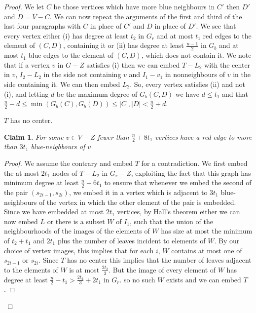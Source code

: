 \documentclass[11pt]{article}
\newtheorem{claim}[theorem]{Claim}
\begin{document}
\begin{proof}
We let $C$ be those vertices which have more blue neighbours in $C'$ then $D'$ and $D=V-C$. 
We can now repeat the arguments of the first and third of the last four paragraphs with $C$ in place of $C'$ and $D$ in place of $D'$. 
We see that every vertex either (i) has degree at least $t_2$ in $G_r$  and at most $t_1$ red edges to the element of $(C,D)$,
containing it or (ii) has degree at least $\frac{n-1}{2}$ in $G_b$  and at most $t_1$ blue  edges to the element of $(C,D)$,
which does not contain it. We note that if  a vertex $v$  in $G-Z$ satisfies  (i) then we can embed $T-L_2$ with the center in $v$, $I_2-L_2$ in the side not containing $v$ and $I_1-v_1$ in nonneighbours of $v$ in the side containing it. We can then embed $L_2$. So, every vertex satisfies (ii) and not (i), and  letting $d$ be the maximum degree of $G_b(C,D)$ we have  $d \le t_1$ and that  
$\frac{n}{2}-d \le \min(G_b(C),G_b(D)) \le |C|,|D| < \frac{n}{2}+d $.
\vskip0.2cm


 $T$ has no center.



\begin{claim}
 For some  $v\in V-Z$ fewer than  $\frac{n}{2}+8t_1$ vertices   have a red edge to  more than  
$3t_1$ blue-neighbours of $v$    
\end{claim}
\begin{proof}
    We assume the contrary and embed $T$ for a contradiction. We  first embed the at most $2t_1$ nodes of $T-L_2$ in $G_r-Z$, exploiting the fact that 
    this graph has minimum degree at least $\frac{n}{2}-6t_1$ to ensure  that 
whenever we embed  the second of the pair $(s_{2i-1},s_{2i})$, we embed it in a vertex which is 
adjacent to $3t_1$ blue-neighbours of 
the vertex in which the other element of the pair  is embedded. Since we have embedded at most $2t_1$ 
vertices, by  Hall's theorem  either we can now embed 
$L$ or there is a subset $W$ of $I_1$, such that the union of the neighbourhoods of 
the images of the elements of $W$ has size at most the minimum of $t_2+t_1$ and  $2t_1$ plus  the number of leaves 
incident to elements of $W$. By our choice of vertex images, this implies that for each $i$, 
$W$ contains at most one of $s_{2i-1}$ or $s_{2i}$. Since $T$ has no center this implies that 
the number of leaves adjacent to  the elements of $W$ is at most  $\frac{2t_2}{3}$. But the image of every 
element of $W$  has degree at least $\frac{n}{2}-t_1>\frac{2t_2}{3}+2t_1$ in $G_r$. so no such $W$ 
exists and we can embed $T$.
\end{proof}


\end{proof}
\end{document}
